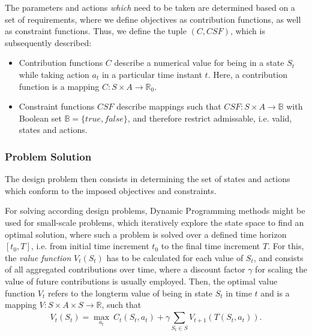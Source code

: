 \documentclass[a4paper,twoside]{article}
\begin{document}
	The parameters and actions \textit{which} need to be taken are determined based on a set of requirements, where we define objectives as contribution functions, as well as constraint functions. Thus, we define the tuple $(C, CSF)$, which is subsequently described:
	
	\begin{itemize}
		\item Contribution functions $C$ describe a numerical value for being in a state $S_{t}$ while taking action $a_{t}$ in a particular time instant $t$. Here, a contribution function is a mapping $C : S \times A \to \mathbb{R}_0$.
		\item Constraint functions $CSF$ describe mappings such that $CSF : S \times A \to \mathbb{B}$ with Boolean set $\mathbb{B} = \{\mathit{true},\mathit{false}\}$, and therefore restrict admissable, i.e. valid, states and actions. 
	\end{itemize}
	
	\subsubsection{Problem Solution}
	The design problem then consists in determining the set of states and actions which conform to the imposed objectives and constraints. 
	
	For solving according design problems, Dynamic Programming \cite{bellman_dynamic_1957} methods might be used for small-scale problems, which iteratively explore the state space to find an optimal solution, where such a problem is solved over a defined time horizon $[t_0,T]$, i.e. from initial time increment $t_0$ to the final time increment $T$. For this, the \textit{value function} $V_t(S_t)$ has to be calculated for each value of $S_t$, and consists of all aggregated contributions over time, where a discount factor $\gamma$ for scaling the value of future contributions is usually employed. Then, the optimal value function $V_t$ refers to the longterm value of being in state $S_t$ in time $t$ and is a mapping $V : S \times A \times S \to \mathbb{R}$, such that
	\begin{equation}
		V_t(S_t) = \max_{a_t}\ C_t(S_t,a_t) + \gamma \sum_{S_t \in S}^{}V_{t+1}(T(S_t,a_t)) \mathrm{.}
	\end{equation}
	
\end{document}
